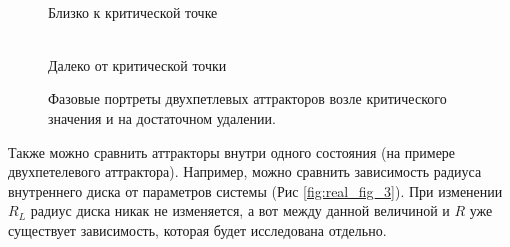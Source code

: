 \documentclass[12pt]{article}
\begin{document}
\begin{figure}[H]
	\centering
	\begin{minipage}[h]{0.47\linewidth}
		  \\ Близко к критической точке
	\end{minipage}
	\hfill
	\begin{minipage}[h]{0.47\linewidth}
		 \\ Далеко от критической точки
	\end{minipage}
	\caption{Фазовые портреты двухпетлевых аттракторов возле критического значения и на достаточном удалении.}
	\label{fig:real_fig_2}
\end{figure}

Также можно сравнить аттракторы внутри одного состояния (на примере двухпетелевого аттрактора). Например, можно сравнить зависимость радиуса внутреннего диска от параметров системы (Рис \ref{fig:real_fig_3}).
При изменении $R_L$ радиус диска никак не изменяется, а вот между данной величиной и $R$ уже существует зависимость, которая будет исследована отдельно.
\end{document}
